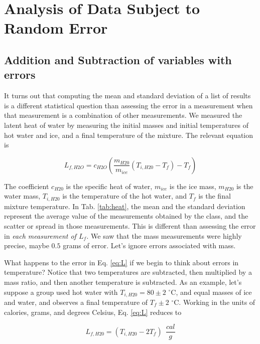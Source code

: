 \documentclass[12pt]{article}
\begin{document}
\section{Analysis of Data Subject to Random Error}

\subsection{Addition and Subtraction of variables with errors}

It turns out that computing the mean and standard deviation of a list of results is a different statistical question than assessing the error in a measurement when that measurement is a combination of other measurements.  We measured the latent heat of water by measuring the initial masses and initial temperatures of hot water and ice, and a final temperature of the mixture.  The relevant equation is

\begin{equation}
L_{f,H2O} = c_{H2O} \left( \frac{m_{H20}}{m_{ice}} (T_{i,H20} - T_f) - T_f \right) \label{eq:L}
\end{equation}

The coefficient $c_{H20}$ is the specific heat of water, $m_{ice}$ is the ice mass, $m_{H20}$ is the water mass, $T_{i,H20}$ is the temperature of the hot water, and $T_f$ is the final mixture temperature.  In Tab. \ref{tab:heat}, the mean and the standard deviation represent the average value of the measurements obtained by the class, and the scatter or spread in those measurements.  This is different than assessing the error in \textit{each measurement of $L_f$.}  We saw that the mass measurements were highly precise, maybe $0.5$ grams of error.  Let's ignore errors associated with mass.

What happens to the error in Eq. \ref{eq:L} if we begin to think about errors in temperature?  Notice that two temperatures are subtracted, then multiplied by a mass ratio, and then another temperature is subtracted.  As an example, let's suppose a group used hot water with $T_{i,H20} = 80\pm 2$ $^{\circ}$C, and equal masses of ice and water, and observes a final temperature of $T_f\pm 2$ $^{\circ}$C.  Working in the units of calories, grams, and degrees Celsius, Eq. \ref{eq:L} reduces to

\begin{equation}
L_{f,H20} = \left( T_{i,H20} - 2T_f\right)~~\frac{cal}{g} \label{eq:L2}
\end{equation}
\end{document}
